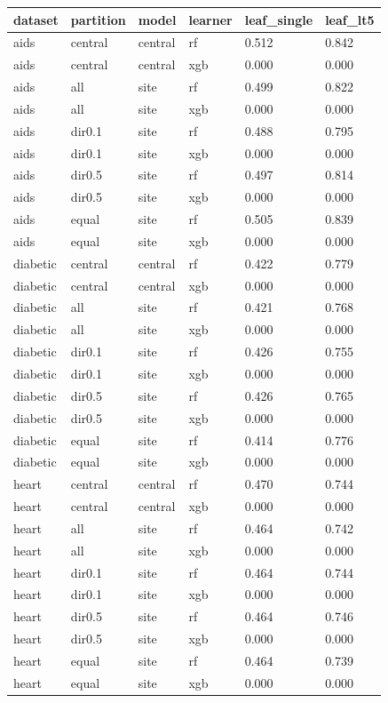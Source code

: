 \begin{tabular}{llllll}
\toprule
dataset & partition & model & learner & leaf\_single & leaf\_lt5 \\
\midrule
aids & central & central & rf & 0.512 & 0.842 \\
aids & central & central & xgb & 0.000 & 0.000 \\
aids & all & site & rf & 0.499 & 0.822 \\
aids & all & site & xgb & 0.000 & 0.000 \\
aids & dir0.1 & site & rf & 0.488 & 0.795 \\
aids & dir0.1 & site & xgb & 0.000 & 0.000 \\
aids & dir0.5 & site & rf & 0.497 & 0.814 \\
aids & dir0.5 & site & xgb & 0.000 & 0.000 \\
aids & equal & site & rf & 0.505 & 0.839 \\
aids & equal & site & xgb & 0.000 & 0.000 \\
\addlinespace
diabetic & central & central & rf & 0.422 & 0.779 \\
diabetic & central & central & xgb & 0.000 & 0.000 \\
diabetic & all & site & rf & 0.421 & 0.768 \\
diabetic & all & site & xgb & 0.000 & 0.000 \\
diabetic & dir0.1 & site & rf & 0.426 & 0.755 \\
diabetic & dir0.1 & site & xgb & 0.000 & 0.000 \\
diabetic & dir0.5 & site & rf & 0.426 & 0.765 \\
diabetic & dir0.5 & site & xgb & 0.000 & 0.000 \\
diabetic & equal & site & rf & 0.414 & 0.776 \\
diabetic & equal & site & xgb & 0.000 & 0.000 \\
\addlinespace
heart & central & central & rf & 0.470 & 0.744 \\
heart & central & central & xgb & 0.000 & 0.000 \\
heart & all & site & rf & 0.464 & 0.742 \\
heart & all & site & xgb & 0.000 & 0.000 \\
heart & dir0.1 & site & rf & 0.464 & 0.744 \\
heart & dir0.1 & site & xgb & 0.000 & 0.000 \\
heart & dir0.5 & site & rf & 0.464 & 0.746 \\
heart & dir0.5 & site & xgb & 0.000 & 0.000 \\
heart & equal & site & rf & 0.464 & 0.739 \\
heart & equal & site & xgb & 0.000 & 0.000 \\
\bottomrule
\end{tabular}
